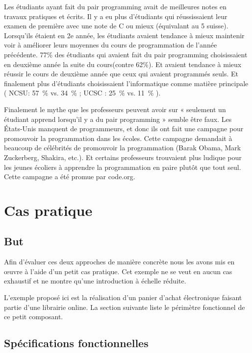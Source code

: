 \documentclass[journal, a4paper, frenchb]{IEEEtran}
\begin{document}
Les étudiants ayant fait du pair programming avait de meilleures notes en travaux pratiques et écrits. Il y a eu plus d'étudiants qui réussissaient leur examen de première avec une note de C ou mieux (équivalant au 5 suisse). Lorsqu’ils étaient en 2e année, les étudiants avaient tendance à mieux maintenir voir à améliorer leurs moyennes du cours de programmation de l’année précédente. 77\% des étudiants qui avaient fait du pair programming choisissaient en deuxième année la suite du cours(contre 62\%). Et avaient tendance à mieux réussir le cours de deuxième année que ceux qui avaient programmés seuls. Et finalement plus d’étudiants choisissaient l’informatique comme matière principale ( NCSU: 57~\% vs. 34~\% ; UCSC : 25~\% vs. 11~\% ).
\cite{PPEtude}

Finalement le mythe que les professeurs peuvent avoir sur « seulement un  étudiant apprend lorsqu’il y a du pair programming » semble être faux. Les États-Unis manquent de programmeurs, et donc ils ont fait une campagne pour promouvoir la programmation dans les écoles. Cette campagne demandait à beaucoup de célébrités de promouvoir la programmation (Barak Obama, Mark Zuckerberg, Shakira, etc.). Et certains professeurs trouvaient plus ludique pour les jeunes écoliers à apprendre la programmation en paire plutôt que  tout seul. Cette campagne a été promue par code.org.
\cite{PPGril}
\cite{PPBarak}

\section{Cas pratique}

\subsection{But}

Afin d'évaluer ces deux approches de manière concrète nous les avons mis en œuvre à l'aide d'un petit cas pratique. Cet exemple ne se veut en aucun cas exhaustif et ne montre qu'une introduction à échelle réduite.

L'exemple proposé ici est la réalisation d'un panier d'achat électronique faisant partie d'une librairie online. La section suivante liste le périmètre fonctionnel de ce petit composant.

\subsection{Spécifications fonctionnelles}
\end{document}
